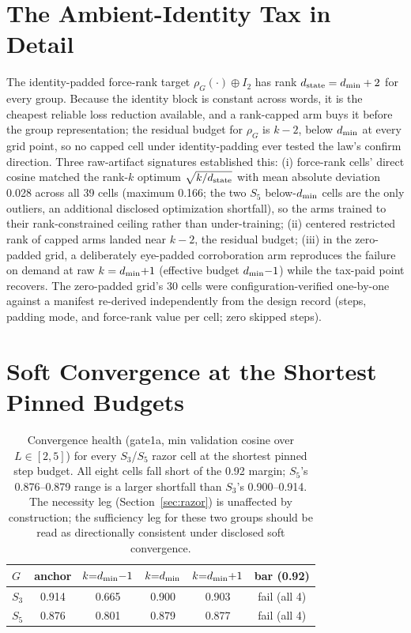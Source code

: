 \section{The Ambient-Identity Tax in Detail}
\label{app:damb}

The identity-padded force-rank target
$\rho_G(\cdot) \oplus I_2$ has rank $d_{\mathrm{state}} = d_{\min} + 2$ for every
group. Because the identity block is constant across words, it is the
cheapest reliable loss reduction available, and a rank-capped arm buys it
before the group representation; the residual budget for $\rho_G$ is
$k - 2$, below $d_{\min}$ at every grid point, so no capped cell under
identity-padding ever tested the law's confirm direction. Three raw-artifact
signatures established this: (i) force-rank cells' direct cosine matched
the rank-$k$ optimum $\sqrt{k/d_{\mathrm{state}}}$ with mean absolute deviation 0.028
across all 39 cells (maximum 0.166; the two $S_5$ below-$d_{\min}$ cells are
the only outliers, an additional disclosed optimization shortfall), so the
arms trained to their rank-constrained ceiling rather than under-training;
(ii) centered restricted rank of capped arms landed near $k - 2$, the
residual budget; (iii) in the zero-padded grid, a deliberately
eye-padded corroboration arm reproduces the failure on demand at raw
$k = d_{\min}{+}1$ (effective budget $d_{\min}{-}1$) while the tax-paid point
recovers.
The zero-padded grid's 30 cells were configuration-verified one-by-one
against a manifest re-derived independently from the design record (steps,
padding mode, and force-rank value per cell; zero skipped steps).

\section{Soft Convergence at the Shortest Pinned Budgets}
\label{app:gate1a}

\begin{table}[h]
\centering
\small
\begin{tabular}{lccccc}
\toprule
$G$ & anchor & $k{=}d_{\min}{-}1$ & $k{=}d_{\min}$ & $k{=}d_{\min}{+}1$ & bar (0.92) \\
\midrule
$S_3$ & 0.914 & 0.665 & 0.900 & 0.903 & fail (all 4) \\
$S_5$ & 0.876 & 0.801 & 0.879 & 0.877 & fail (all 4) \\
\bottomrule
\end{tabular}
\caption{Convergence health (gate1a, min validation cosine over
$L \in [2, 5]$) for every $S_3$/$S_5$ razor cell at the shortest pinned
step budget. All eight cells fall short of the 0.92 margin; $S_5$'s
0.876--0.879 range is a larger shortfall than $S_3$'s 0.900--0.914. The
necessity leg (Section~\ref{sec:razor}) is unaffected by construction; the
sufficiency leg for these two groups should be read as directionally
consistent under disclosed soft convergence.}
\label{tab:gate1a}
\end{table}


